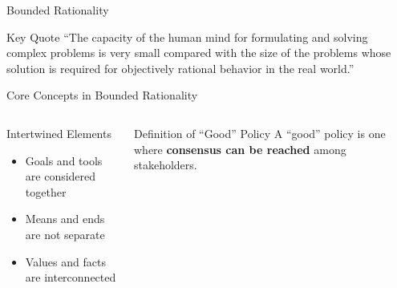 \documentclass[10pt]{beamer}
\begin{document}
\begin{frame}{Bounded Rationality}
\begin{center}
\end{center}

\begin{block}{Key Quote}
``The capacity of the human mind for formulating and solving complex problems is very small compared with the size of the problems whose solution is required for objectively rational behavior in the real world.''
\end{block}
\end{frame}

\begin{frame}{Core Concepts in Bounded Rationality}
\begin{columns}
\begin{column}{0.5\textwidth}
\begin{block}{Intertwined Elements}
\begin{itemize}
\item Goals and tools are considered together
\item Means and ends are not separate
\item Values and facts are interconnected
\end{itemize}
\end{block}
\end{column}
\begin{column}{0.5\textwidth}
\begin{block}{Definition of ``Good'' Policy}
A ``good'' policy is one where \textcolor{titanorange}{\textbf{consensus can be reached}} among stakeholders.
\end{block}
\end{column}
\end{columns}
\end{frame}
\end{document}
